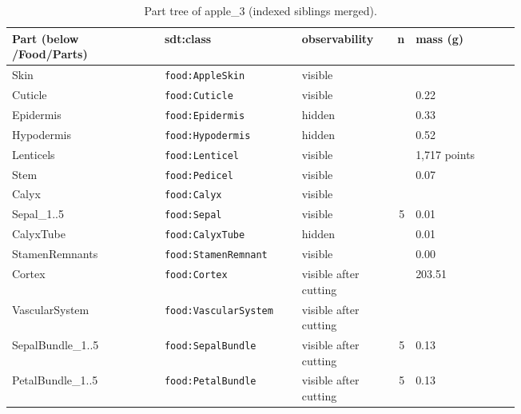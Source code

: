 \documentclass[10.5pt,a4paper]{article}
\begin{document}
\begin{table}[htbp]\centering\scriptsize\caption{Part tree of apple\_3 (indexed siblings merged).}
\begin{tabularx}{\linewidth}{@{}p{0.30\linewidth}p{0.27\linewidth}p{0.17\linewidth}rX@{}}\toprule Part (below /Food/Parts) & sdt:class & observability & n & mass (g) \\\midrule
\hspace*{0.0em}Skin & \texttt{food:AppleSkin} & visible &  &  \\
\hspace*{0.9em}Cuticle & \texttt{food:Cuticle} & visible &  & 0.22 \\
\hspace*{0.9em}Epidermis & \texttt{food:Epidermis} & hidden &  & 0.33 \\
\hspace*{0.9em}Hypodermis & \texttt{food:Hypodermis} & hidden &  & 0.52 \\
\hspace*{0.9em}Lenticels & \texttt{food:Lenticel} & visible &  & 1,717 points \\
\hspace*{0.0em}Stem & \texttt{food:Pedicel} & visible &  & 0.07 \\
\hspace*{0.0em}Calyx & \texttt{food:Calyx} & visible &  &  \\
\hspace*{0.9em}Sepal\_1..5 & \texttt{food:Sepal} & visible & 5 & 0.01 \\
\hspace*{0.9em}CalyxTube & \texttt{food:CalyxTube} & hidden &  & 0.01 \\
\hspace*{0.9em}StamenRemnants & \texttt{food:StamenRemnant} & visible &  & 0.00 \\
\hspace*{0.0em}Cortex & \texttt{food:Cortex} & visible after cutting &  & 203.51 \\
\hspace*{0.0em}VascularSystem & \texttt{food:VascularSystem} & visible after cutting &  &  \\
\hspace*{0.9em}SepalBundle\_1..5 & \texttt{food:SepalBundle} & visible after cutting & 5 & 0.13 \\
\hspace*{0.9em}PetalBundle\_1..5 & \texttt{food:PetalBundle} & visible after cutting & 5 & 0.13 \\

\end{tabularx}
\end{table}
\end{document}
